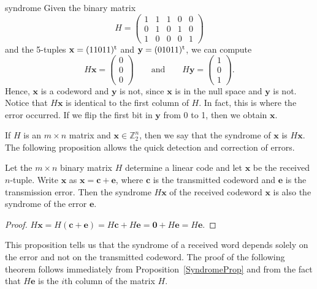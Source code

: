 \begin{example}{syndrome}
Given the binary matrix
\[
H =
\begin{pmatrix}
1 & 1 & 1 & 0 & 0 \\
0 & 1 & 0 & 1 & 0 \\
1 & 0 & 0 & 0 & 1
\end{pmatrix}
\]
and the 5-tuples ${\mathbf x} = (11011)^{\rm t}$ and ${\mathbf y} =
(01011)^{\rm t}$, we can compute
\[
H{\mathbf x} =
\begin{pmatrix}
0 \\ 0 \\ 0 
\end{pmatrix}
\qquad
\text{and}
\qquad
H{\mathbf y} =
\begin{pmatrix}
1 \\ 0 \\ 1 
\end{pmatrix}.
\]
Hence, ${\mathbf x}$ is a codeword and ${\mathbf y}$ is not, since
${\mathbf x}$ is in the null space and ${\mathbf y}$ is not. Notice that
$H{\mathbf x}$ is identical to the first column of $H$. In fact, this is
where the error occurred. If we flip the first bit in ${\mathbf y}$ from
0 to 1, then we obtain ${\mathbf x}$.  
\end{example}
 
 
If $H$ is an $m \times n$ matrix and ${\mathbf x} \in {\mathbb Z}_2^n$,
then we say that the {\bfi syndrome\/} of
${\mathbf x}$ is $H{\mathbf x}$. The following proposition allows
the quick detection and correction of errors.
 
 
\begin{proposition}\label{SyndromeProp}
Let the $m \times n$ binary matrix $H$ determine a linear code and let
${\mathbf x}$ be the received $n$-tuple. Write ${\mathbf x}$ as ${\mathbf x}
=  {\mathbf c} +{\mathbf e}$, where ${\mathbf c}$ is the transmitted codeword
and ${\mathbf e}$ is the transmission error. Then the syndrome  $H{\mathbf
x}$ of the received codeword ${\mathbf x}$ is also the syndrome
of the error ${\mathbf e}$.
\end{proposition}
 
 
\begin{proof}
$H{\mathbf x} = H({\mathbf c} +{\mathbf e}) = H{\mathbf c} + H{\mathbf e} =
{\mathbf 0} + H{\mathbf e} = H{\mathbf e}$.  
\end{proof}
 
 
\medskip
 
 
This proposition tells us that the syndrome of a received word depends
solely on the error and not on the transmitted codeword. The proof of the
following theorem follows immediately from Proposition~\ref{SyndromeProp} and from
the fact that $H{\mathbf e}$ is the $i$th column of the matrix $H$.
 
